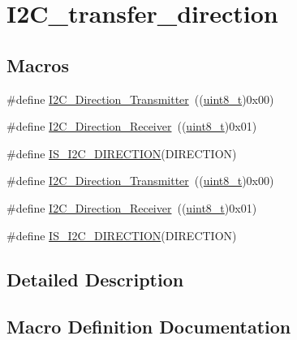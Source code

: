 \hypertarget{group___i2_c__transfer__direction}{}\section{I2\+C\+\_\+transfer\+\_\+direction}
\label{group___i2_c__transfer__direction}
\subsection*{Macros}
\begin{DoxyCompactItemize}
\item 
\#define \hyperlink{group___i2_c__transfer__direction_ga9895ee2d7d8cc8ba4daafafa1c3ce1ac}{I2\+C\+\_\+\+Direction\+\_\+\+Transmitter}~((\hyperlink{_p_e___types_8h_aba7bc1797add20fe3efdf37ced1182c5}{uint8\+\_\+t})0x00)
\item 
\#define \hyperlink{group___i2_c__transfer__direction_gafe3b9b98552980ca56c8e21a90040fa0}{I2\+C\+\_\+\+Direction\+\_\+\+Receiver}~((\hyperlink{_p_e___types_8h_aba7bc1797add20fe3efdf37ced1182c5}{uint8\+\_\+t})0x01)
\item 
\#define \hyperlink{group___i2_c__transfer__direction_ga33368efe652bc25b4f4b74f02ce0657e}{I\+S\+\_\+\+I2\+C\+\_\+\+D\+I\+R\+E\+C\+T\+I\+ON}(D\+I\+R\+E\+C\+T\+I\+ON)
\item 
\#define \hyperlink{group___i2_c__transfer__direction_ga9895ee2d7d8cc8ba4daafafa1c3ce1ac}{I2\+C\+\_\+\+Direction\+\_\+\+Transmitter}~((\hyperlink{_p_e___types_8h_aba7bc1797add20fe3efdf37ced1182c5}{uint8\+\_\+t})0x00)
\item 
\#define \hyperlink{group___i2_c__transfer__direction_gafe3b9b98552980ca56c8e21a90040fa0}{I2\+C\+\_\+\+Direction\+\_\+\+Receiver}~((\hyperlink{_p_e___types_8h_aba7bc1797add20fe3efdf37ced1182c5}{uint8\+\_\+t})0x01)
\item 
\#define \hyperlink{group___i2_c__transfer__direction_ga33368efe652bc25b4f4b74f02ce0657e}{I\+S\+\_\+\+I2\+C\+\_\+\+D\+I\+R\+E\+C\+T\+I\+ON}(D\+I\+R\+E\+C\+T\+I\+ON)
\end{DoxyCompactItemize}


\subsection{Detailed Description}


\subsection{Macro Definition Documentation}
